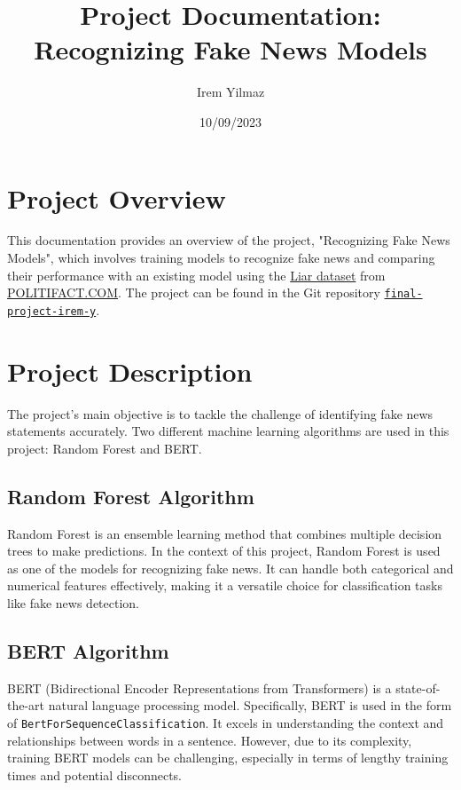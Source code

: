 \documentclass{article}
\begin{document}
\title{Project Documentation: Recognizing Fake News Models}
\author{Irem Yilmaz}
\date{10/09/2023}
\maketitle

\section*{Project Overview}
This documentation provides an overview of the project, "Recognizing Fake News Models", which involves training models to recognize fake news and comparing their performance with an existing model using the \href{https://huggingface.co/datasets/liar}{Liar dataset} from \href{https://www.politifact.com/}{POLITIFACT.COM}.
The project can be found in the Git repository \href{https://github.com/iame-uni-bonn/final-project-irem-y}{\texttt{final-project-irem-y}}.
\section*{Project Description}
The project's main objective is to tackle the challenge of identifying fake news statements accurately. Two different machine learning algorithms are used in this project: Random Forest and BERT.

\subsection*{Random Forest Algorithm}
Random Forest is an ensemble learning method that combines multiple decision trees to make predictions. In the context of this project, Random Forest is used as one of the models for recognizing fake news. It can handle both categorical and numerical features effectively, making it a versatile choice for classification tasks like fake news detection.

\subsection*{BERT Algorithm}
BERT (Bidirectional Encoder Representations from Transformers) is a state-of-the-art natural language processing model. Specifically, BERT is used in the form of \texttt{BertForSequenceClassification}. It excels in understanding the context and relationships between words in a sentence. However, due to its complexity, training BERT models can be challenging, especially in terms of lengthy training times and potential disconnects.
\end{document}
